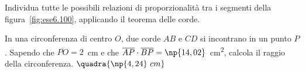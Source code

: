 \noindent\begin{minipage}{.4\textwidth}
\begin{esercizio}
\label{ese:6.100}
Individua tutte le possibili relazioni di proporzionalità tra i 
segmenti della figura~\ref{fig:ese6.100}, applicando il teorema delle 
corde.
\end{esercizio}
\end{minipage}
\begin{minipage}{.6\textwidth}
\begin{inaccessibleblock}
 \begin{center}  \end{center}
\end{inaccessibleblock}
\end{minipage}


% 

\begin{esercizio}
\label{ese:6.104}
In una circonferenza di centro $O$, due corde $AB$ e $CD$ si 
incontrano in un punto $P$. Sapendo che $\overline{PO}=2$~cm e che 
$\overline{AP}\cdot \overline{BP}=\np{14,02}$~cm\textsuperscript{2}, 
calcola il raggio della circonferenza.
\hfill$\quadra{\np{4,24}~cm}$
\end{esercizio}

